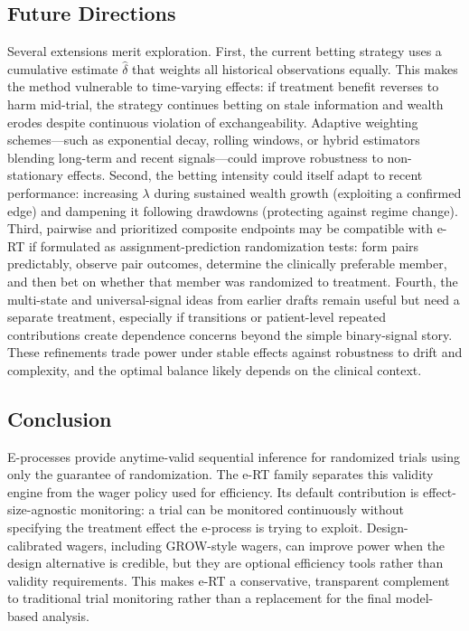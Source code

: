 \documentclass[10pt]{article}
\begin{document}
\subsection{Future Directions}

Several extensions merit exploration. First, the current betting strategy uses a cumulative estimate $\hat{\delta}$ that weights all historical observations equally. This makes the method vulnerable to time-varying effects: if treatment benefit reverses to harm mid-trial, the strategy continues betting on stale information and wealth erodes despite continuous violation of exchangeability. Adaptive weighting schemes---such as exponential decay, rolling windows, or hybrid estimators blending long-term and recent signals---could improve robustness to non-stationary effects. Second, the betting intensity could itself adapt to recent performance: increasing $\lambda$ during sustained wealth growth (exploiting a confirmed edge) and dampening it following drawdowns (protecting against regime change). Third, pairwise and prioritized composite endpoints may be compatible with e-RT if formulated as assignment-prediction randomization tests: form pairs predictably, observe pair outcomes, determine the clinically preferable member, and then bet on whether that member was randomized to treatment. Fourth, the multi-state and universal-signal ideas from earlier drafts remain useful but need a separate treatment, especially if transitions or patient-level repeated contributions create dependence concerns beyond the simple binary-signal story. These refinements trade power under stable effects against robustness to drift and complexity, and the optimal balance likely depends on the clinical context.

\subsection{Conclusion}

E-processes provide anytime-valid sequential inference for randomized trials using only the guarantee of randomization. The e-RT family separates this validity engine from the wager policy used for efficiency. Its default contribution is effect-size-agnostic monitoring: a trial can be monitored continuously without specifying the treatment effect the e-process is trying to exploit. Design-calibrated wagers, including GROW-style wagers, can improve power when the design alternative is credible, but they are optional efficiency tools rather than validity requirements. This makes e-RT a conservative, transparent complement to traditional trial monitoring rather than a replacement for the final model-based analysis.
\end{document}
